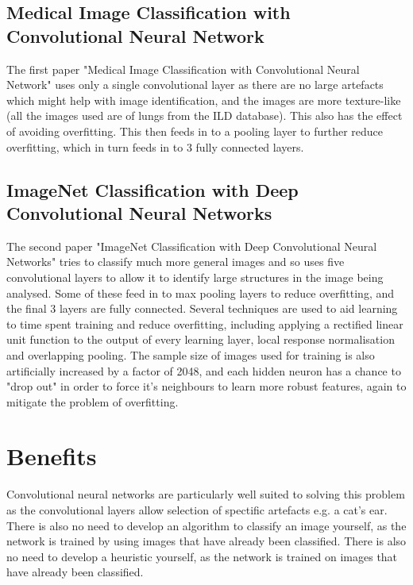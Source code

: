 \documentclass{article}
\begin{document}
\subsection{Medical Image Classification with Convolutional Neural Network}
The first paper "Medical Image Classification with Convolutional Neural Network" uses only a single convolutional layer as there are no large artefacts which might help with image identification, and the images are more texture-like (all the images used are of lungs from the ILD database)\cite{medical}. This also has the effect of avoiding overfitting\cite{medical}. This then feeds in to a pooling layer to further reduce overfitting, which in turn feeds in to 3 fully connected layers.

\subsection{ImageNet Classification with Deep Convolutional Neural Networks}
The second paper "ImageNet Classification with Deep Convolutional Neural Networks" tries to classify much more general images and so uses five convolutional layers to allow it to identify large structures in the image being analysed\cite{imagenet}. Some of these feed in to max pooling layers to reduce overfitting, and the final 3 layers are fully connected. Several techniques are used to aid learning to time spent training and reduce overfitting, including applying a rectified linear unit function to the output of every learning layer, local response normalisation and overlapping pooling. The sample size of images used for training is also artificially increased by a factor of 2048, and each hidden neuron has a chance to "drop out" in order to force it's neighbours to learn more robust features, again to mitigate the problem of overfitting. 

\section{Benefits}

Convolutional neural networks are particularly well suited to solving this problem as the convolutional layers allow selection of spectific artefacts e.g. a cat's ear. There is also no need to develop an algorithm to classify an image yourself, as the network is trained by using images that have already been classified. There is also no need to develop a heuristic yourself, as the network is trained on images that have already been classified.
\end{document}
